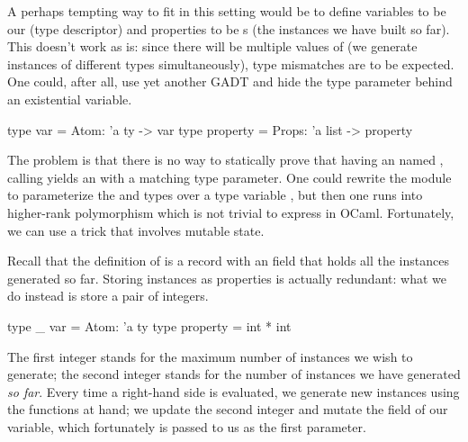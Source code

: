 A perhaps tempting way to fit in this setting would be to define variables to be
our  (type descriptor) and properties to be s (the
instances we have built so far). This doesn't work as is: since there will be
multiple values of  (we generate instances of different types
simultaneously), type mismatches are to be expected. One could, after all, use
yet another GADT and hide the  type parameter behind an existential
variable.
%
\begin{ocamlcode}
  type var = Atom: 'a ty -> var
  type property = Props: 'a list -> property
\end{ocamlcode}
%
The problem is that there is no way to statically prove that having an
 named , calling  yields an
 with a matching type parameter. One could rewrite the
 module to parameterize the  and  types over
a type variable , but then one runs into higher-rank polymorphism which
is not trivial to express in OCaml. Fortunately, we can use a trick that
involves mutable state.

Recall that the definition of  is a record with an  field
that holds all the instances generated so far. Storing instances as
properties is actually redundant: what we do instead is store a pair of
integers.
%
\begin{ocamlcode}
  type _ var = Atom: 'a ty
  type property = int * int
\end{ocamlcode}
%
The first integer stands for the maximum number of instances we wish to
generate; the second integer stands for the number of instances we have
generated \emph{so far}.
Every time a right-hand side is evaluated, we generate new instances using the
functions at hand; we update the second integer and mutate the  field
of our variable, which fortunately is passed to us as the first parameter.
